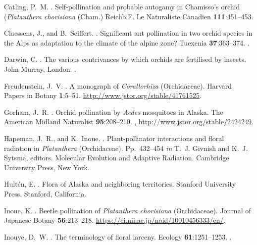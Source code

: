\begin{multicols}{2}
\begin{thebibliography}{27}
Catling, P.~M.
.
\newblock Self-pollination and probable autogamy in Chamisso's orchid
  (\emph{Platanthera chorisiana} (Cham.) Reichb.F.
\newblock Le Naturaliste Canadien {\bfseries 111}:451--453.

Claessens, J., and B.~Seiffert.
.
\newblock Significant ant pollination in two orchid species in the Alps as
  adaptation to the climate of the alpine zone?
\newblock Tuexenia {\bfseries 37}:363--374.
\newblock {}.

Darwin, C.
.
\newblock The various contrivances by which orchids are fertilised by insects.
\newblock John Murray, London.
\newblock {}.

Freudenstein, J.~V.
.
\newblock A monograph of \emph{Corallorhiza} (Orchidaceae).
\newblock Harvard Papers in Botany {\bfseries 1}:5--51.
\newblock \urlprefix\url{http://www.jstor.org/stable/41761525}.

Gorham, J.~R.
.
\newblock Orchid pollination by \emph{Aedes} mosquitoes in {Alaska}.
\newblock The American Midland Naturalist {\bfseries 95}:208--210.
\newblock {},
  \urlprefix\url{http://www.jstor.org/stable/2424249}.

Hapeman, J.~R., and K.~Inoue.
.
\newblock Plant-pollinator interactions and floral radiation in
  \textit{Platanthera} (Orchidaceae).
\newblock Pp.\ 432--454 {\em in\/} T.~J. Givnish and K.~J. Sytsma, editors.
  Molecular Evolution and Adaptive Radiation. Cambridge University Press, New
  York.

Hultén, E.
.
\newblock Flora of {Alaska} and neighboring territories.
\newblock Stanford University Press, Stanford, California.

Inoue, K.
.
\newblock Beetle pollination of \emph{Platanthera chorisiana} (Orchidaceae).
\newblock Journal of Japanese Botany {\bfseries 56}:213--218.
\newblock \urlprefix\url{https://ci.nii.ac.jp/naid/10010456333/en/}.

Inouye, D.~W.
.
\newblock The terminology of floral larceny.
\newblock Ecology {\bfseries 61}:1251--1253.
\newblock {}.


\end{thebibliography}
\end{multicols}
